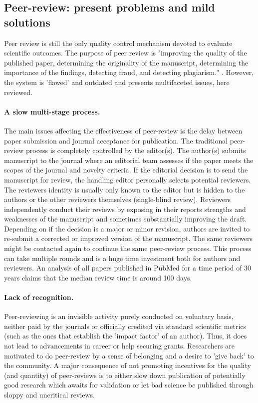 \documentclass[runningheads]{llncs}
\begin{document}
\subsection{Peer-review: present problems and mild solutions}
Peer review is still the only quality control mechanism devoted to evaluate scientific outcomes. The purpose of peer review is "improving the quality of the published paper, determining the originality of the manuscript, determining the importance of the findings, detecting fraud, and detecting plagiarism." \cite{Gropp-PeerRevStress}. However, the system is 'ﬂawed' and outdated \cite{Smith2006} and presents multifaceted issues, here reviewed.
\paragraph{A slow multi-stage process.} The main issues affecting the effectiveness of peer-review is the delay between paper submission and journal acceptance for publication. The traditional peer-review process is completely controlled by the editor(s). The author(s) submits manuscript to the journal where an editorial team assesses if the paper meets the scopes of the journal and novelty criteria. If the editorial decision is to send the manuscript for review, the handling editor personally selects potential reviewers. The reviewers identity is usually only known to the editor but is hidden to the authors or the other reviewers themselves (single-blind review). Reviewers independently conduct their reviews by exposing in their reports strengths and weaknesses of the manuscript and sometimes substantially improving the draft. Depending on if the decision is a major or minor revision, authors are invited to re-submit a corrected or improved version of the manuscript. The same reviewers might be contacted again to continue the same peer-review process. This process can take multiple rounds and is a huge time investment both for authors and reviewers. An analysis of all papers published in PubMed for a time period of 30 years claims that the median review time is around 100 days\cite{Kendall-peerrev}.
\paragraph{Lack of recognition.} Peer-reviewing is an invisible activity purely conducted on voluntary basis, neither paid by the journals or officially credited via standard scientific metrics (such as the ones that establish the 'impact factor' of an author). Thus, it does not lead to advancements in career or help securing grants. Researchers are motivated to do peer-review by a sense of belonging and a desire to 'give back' to the community. A major consequence of not promoting incentives for the quality (and quantity) of peer-reviews is to either slow down publication of potentially good research which awaits for validation or let bad science be published through sloppy and uncritical reviews.
\end{document}
